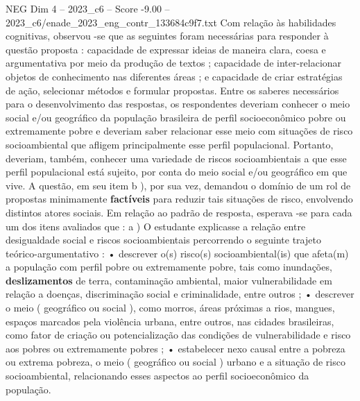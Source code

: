 \begin{textsample}{NEG Dim 4 – 2023\_c6 – Score -9.00 – 2023\_c6/enade\_2023\_eng\_contr\_133684c9f7.txt}
Com relação às habilidades cognitivas, observou -se que as seguintes foram necessárias para responder à questão proposta : capacidade de expressar ideias de maneira clara, coesa e argumentativa por meio da produção de textos ; capacidade de inter-relacionar objetos de conhecimento nas diferentes áreas ; e capacidade de criar estratégias de ação, selecionar métodos e formular propostas.
Entre os saberes necessários para o desenvolvimento das respostas, os respondentes deveriam conhecer o meio social e/ou geográfico da população brasileira de perfil socioeconômico pobre ou extremamente pobre e deveriam saber relacionar esse meio com situações de risco socioambiental que afligem principalmente esse perfil populacional.
Portanto, deveriam, também, conhecer uma variedade de riscos socioambientais a que esse perfil populacional está sujeito, por conta do meio social e/ou geográfico em que vive.
A questão, em seu item b ), por sua vez, demandou o domínio de um rol de propostas minimamente \textbf{factíveis} para reduzir tais situações de risco, envolvendo distintos atores sociais.
Em relação ao padrão de resposta, esperava -se para cada um dos itens avaliados que : a ) O estudante explicasse a relação entre desigualdade social e riscos socioambientais percorrendo o seguinte trajeto teórico-argumentativo : • descrever o(s) risco(s) socioambiental(is) que afeta(m) a população com perfil pobre ou extremamente pobre, tais como inundações, \textbf{deslizamentos} de terra, contaminação ambiental, maior vulnerabilidade em relação a doenças, discriminação social e criminalidade, entre outros ; • descrever o meio ( geográfico ou social ), como morros, áreas próximas a rios, mangues, espaços marcados pela violência urbana, entre outros, nas cidades brasileiras, como fator de criação ou potencialização das condições de vulnerabilidade e risco aos pobres ou extremamente pobres ; • estabelecer nexo causal entre a pobreza ou extrema pobreza, o meio ( geográfico ou social ) urbano e a situação de risco socioambiental, relacionando esses aspectos ao perfil socioeconômico da população.

\end{textsample}
